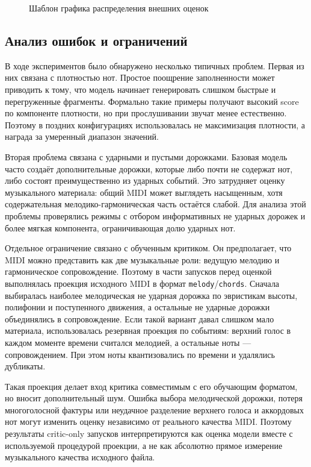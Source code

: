 \documentclass[a4paper,12pt]{extarticle}
\begin{document}
\begin{figure}[h]
\centering
{}
\caption{Шаблон графика распределения внешних оценок}
\label{fig:external-score-placeholder}
\end{figure}

\subsection{Анализ ошибок и ограничений}

В ходе экспериментов было обнаружено несколько типичных проблем. Первая из
них связана с плотностью нот. Простое поощрение заполненности может приводить
к тому, что модель начинает генерировать слишком быстрые и перегруженные
фрагменты. Формально такие примеры получают высокий score по компоненте
плотности, но при прослушивании звучат менее естественно. Поэтому в поздних
конфигурациях использовалась не максимизация плотности, а награда за умеренный
диапазон значений.

Вторая проблема связана с ударными и пустыми дорожками. Базовая модель часто
создаёт дополнительные дорожки, которые либо почти не содержат нот, либо
состоят преимущественно из ударных событий. Это затрудняет оценку музыкального
материала: общий MIDI может выглядеть насыщенным, хотя содержательная
мелодико-гармоническая часть остаётся слабой. Для анализа этой проблемы
проверялись режимы с отбором информативных не ударных дорожек и более мягкая
компонента, ограничивающая долю ударных нот.

Отдельное ограничение связано с обученным критиком. Он предполагает, что MIDI
можно представить как две музыкальные роли: ведущую мелодию и гармоническое
сопровождение. Поэтому в части запусков перед оценкой выполнялась проекция
исходного MIDI в формат \texttt{melody}/\texttt{chords}. Сначала выбиралась
наиболее мелодическая не ударная дорожка по эвристикам высоты, полифонии и
поступенного движения, а остальные не ударные дорожки объединялись в
сопровождение. Если такой вариант давал слишком мало материала, использовалась
резервная проекция по событиям: верхний голос в каждом моменте времени
считался мелодией, а остальные ноты --- сопровождением. При этом ноты
квантизовались по времени и удалялись дубликаты.

Такая проекция делает вход критика совместимым с его обучающим форматом, но
вносит дополнительный шум. Ошибка выбора мелодической дорожки, потеря
многоголосной фактуры или неудачное разделение верхнего голоса и аккордовых
нот могут изменить оценку независимо от реального качества MIDI. Поэтому
результаты critic-only запусков интерпретируются как оценка модели вместе с
используемой процедурой проекции, а не как абсолютно прямое измерение
музыкального качества исходного файла.
\end{document}

